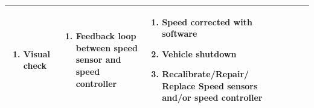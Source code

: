 \documentclass [10pt]{article}
\begin{document}
{\begin{minipage}{\textwidth}
\begin{longtable}{ |p{ }  | p{ } |  p{ } |  p{ } | p{ } | p{ } |  p{ }|}
\begin{minipage}{.18\textwidth}
\begin{enumerate}
                    \item Visual check \vspace {1mm}
                \end{enumerate}
        \end{minipage}
    & \cellcolor{tableCell}\begin{minipage}{.23\textwidth} 
                \vspace{2mm}
                \begin{enumerate}
                    \item Feedback loop between speed sensor and speed controller \vspace {1mm}
                \end{enumerate}
        \end{minipage}
    
    
    & \begin{minipage}{.24 \columnwidth} 
                \vspace{2mm}
                \begin{enumerate}
                    \item Speed corrected with software
                    \item Vehicle shutdown 
                    \item Recalibrate/Repair/ Replace Speed sensors and/or speed controller \vspace {1mm}
                \end{enumerate}
        \end{minipage} \\ \hline
   
    
    
   
    
     
    \end{longtable}
    
    
    
    \end{minipage}}
    
\end{document}
